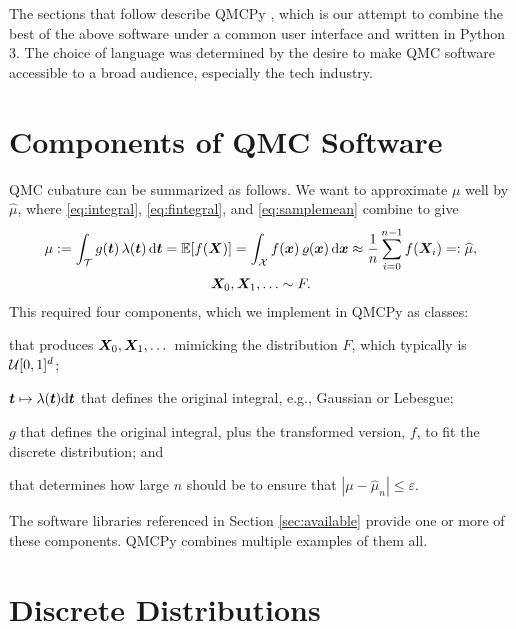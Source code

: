 \documentclass[graybox,footinfo]{svmult}
\newcommand{\QMCPYabs}[1]{\ensuremath{{\left \lvert #1 \right \rvert}}}
\newcommand{\hmu}{\widehat{\mu}}
\begin{document}
The sections that follow describe QMCPy \cite{QMCPy2020a}, which is our attempt to combine the best of the above software under a common user interface and written in Python 3.  The choice of language was determined by the desire to make QMC software accessible to a broad audience, especially the tech industry.


\section{Components of QMC Software}
QMC cubature can be summarized as follows.  We want to approximate $\mu$ well by $\hmu$, where \eqref{eq:integral}, \eqref{eq:fintegral}, and \eqref{eq:samplemean} combine to give
\begin{multline} \label{eq:cubSummary}
	\mu : = \int_\calT g(\bst) \, \lambda(\bst) \, \D \bst  = \bbE[f(\bsX)] = \int_\calX f(\bsx) \, \varrho(\bsx) \, \D \bsx \approx \frac 1n \sum_{i=0}^{n-1} f(\bsX_i) =: \hmu, \\
	 \bsX_0, \bsX_1, \ldots \sim F.
\end{multline}
This required four components, which we implement in QMCPy as classes:

\begin{description}[format=\textup,format=\textbf]
	
	\item[Discrete Distribution] that produces ${\boldsymbol{X}}_0, {\boldsymbol{X}}_1, \dots$ mimicking the distribution $F$, which typically is ${\mathcal{U}}[0,1]^d$;
	
	\item[True Measure] ${\boldsymbol{t}} \mapsto \lambda ({\boldsymbol{t}}) \mathrm{d} {\boldsymbol{t}}$ that defines the original integral, e.g., Gaussian or Lebesgue;
	
	\item[Integrand] $g$ that  defines the original integral, plus the transformed version, $f$, to fit the discrete distribution; and
	
	\item[Stopping Criterion] that determines how large $n$ should be to ensure that $\QMCPYabs{\mu - \hmu_n} \le \varepsilon$.
\end{description}

The software libraries referenced in Section \ref{sec:available} provide one or more of these components.  QMCPy combines multiple examples of them all.


\section{Discrete Distributions}
\end{document}
